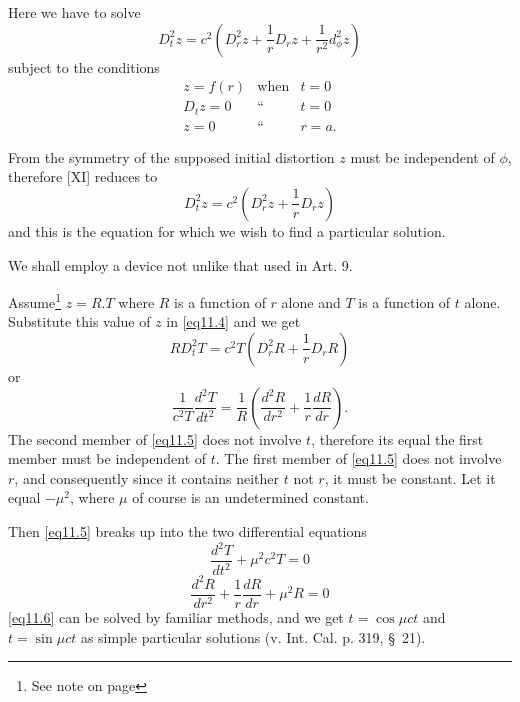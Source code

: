\documentclass[oneside,12pt]{book}
\begin{document}
Here we have to solve 
\begin{equation*}
    D_t^2z=c^2\left(D_r^2z+\frac{1}{r}D_rz+\frac{1}{r^2}d_\phi^2z \right)
    \tag{[XI] Art. 1}
\end{equation*}
subject to the conditions 
\begin{eqnarray}
    z=f(r) & \text{when} & t=0 \label{eq11.1} \\ 
    D_tz=0 & \text{``} & t=0 \label{eq11.2} \\ 
    z=0 & \text{``} & r=a. \label{eq11.3} 
\end{eqnarray} \par 

From the symmetry of the supposed initial distortion $z$ must be independent of $\phi$, therefore [XI] reduces to 
\begin{equation}
    D_t^2z=c^2\left(D_r^2z+\frac{1}{r}D_rz\right) \label{eq11.4}
\end{equation}
and this is the equation for which we wish to find a particular solution. \par 

We shall employ a device not unlike that used in Art. 9. \par 

Assume\footnote{See note on page \pageref{note2}} $z=R.T$ where $R$ is a function of $r$ alone and $T$ is a function of $t$ alone. Substitute this value of $z$ in \eqref{eq11.4} and we get 
\begin{equation*}
    RD_t^2T=c^2T\left(D_r^2R+\frac{1}{r}D_rR\right)
\end{equation*}
or 
\begin{equation*}
    \frac{1}{c^2T}\frac{d^2T}{dt^2}=\frac{1}{R}\left(\frac{d^2R}{dr^2}+\frac{1}{r}\frac{dR}{dr}\right). \label{eq11.5}
\end{equation*}
The second member of \eqref{eq11.5} does not involve $t$, therefore its equal the first member must be independent of $t$. The first member of \eqref{eq11.5} does not involve $r$, and consequently since it contains neither $t$ not $r$, it must be constant. Let it equal $-\mu^2$, where $\mu$ of course is an undetermined constant. \par 

Then \eqref{eq11.5} breaks up into the two differential equations 
\begin{equation}
    \frac{d^2T}{dt^2}+\mu^2c^2T=0 \label{eq11.6}
\end{equation}
\begin{equation}
    \frac{d^2R}{dr^2}+\frac{1}{r}\frac{dR}{dr}+\mu^2R=0 \label{eq11.7}
\end{equation}
\eqref{eq11.6} can be solved by familiar methods, and we get $t=\cos\mu ct$ and $t=\sin\mu ct$ as simple particular solutions (v. Int. Cal. p. 319, \S\, 21). \par 
\end{document}

